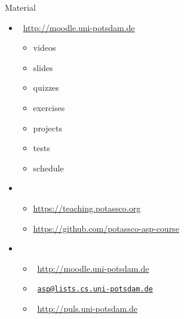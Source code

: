 \begin{frame}{Material}
  \bigskip
  \begin{itemize}\itemsep 0pt
  \item {}      \ \url{http://moodle.uni-potsdam.de}
        \begin{itemize}
        \item {videos}
        \item {slides}
        \item {quizzes}
        \item {exercises}
        \item {projects}
        \item {tests}
        \item {schedule}
        \end{itemize}
  \item {}
    \begin{itemize}
    \item \url{https://teaching.potassco.org}
    \item \url{https://github.com/potassco-asp-course}
    \end{itemize}
    \medskip
  \item {}
    \begin{itemize}
    \item {}         \ \url{http://moodle.uni-potsdam.de}
    \item {}          \ \href{mailto:asp@lists.cs.uni-potsdam.de}{\texttt{asp@lists.cs.uni-potsdam.de}}
    \item {} \ \url{http://puls.uni-potsdam.de}
    \end{itemize}
    \medskip
  \end{itemize}
\end{frame}
%
